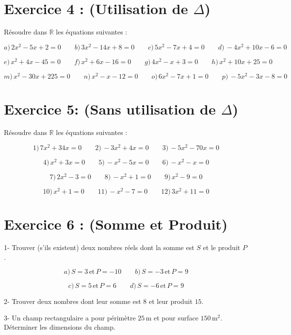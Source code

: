 \documentclass[12pt]{article}
\begin{document}
\section*{Exercice 4 : (Utilisation de \(\Delta\))}

Résoudre dans \(\mathbb{R}\) les équations suivantes :

\[
a) \, 2x^2 - 5x + 2 = 0 \quad\quad b) \, 3x^2 - 14x + 8 = 0 \quad\quad c) \, 5x^2 - 7x + 4 = 0 \quad\quad d) \, -4x^2 + 10x - 6 = 0
\]

\[
e) \, x^2 + 4x - 45 = 0 \quad\quad f) \, x^2 + 6x - 16 = 0 \quad\quad g) \, 4x^2 - x + 3 = 0 \quad\quad h) \, x^2 + 10x + 25 = 0
\]

\[
m) \, x^2 - 30x + 225 = 0 \quad\quad n) \, x^2 - x - 12 = 0 \quad\quad o) \, 6x^2 - 7x + 1 = 0 \quad\quad p) \, -5x^2 - 3x - 8 = 0
\]

\section*{Exercice 5: (Sans utilisation de \(\Delta\))}

Résoudre dans \(\mathbb{R}\) les équations suivantes :

\[
1) \, 7x^2 + 34x = 0 \quad\quad 2) \, -3x^2 + 4x = 0 \quad\quad 3) \, -5x^2 - 70x = 0
\]

\[
4) \, x^2 + 3x = 0 \quad\quad 5) \, -x^2 - 5x = 0 \quad\quad 6) \, -x^2 - x = 0
\]

\[
7) \, 2x^2 - 3 = 0 \quad\quad 8) \, -x^2 + 1 = 0 \quad\quad 9) \, x^2 - 9 = 0
\]

\[
10) \, x^2 + 1 = 0 \quad\quad 11) \, -x^2 - 7 = 0 \quad\quad 12) \, 3x^2 + 11 = 0
\]

\section*{Exercice 6 : (Somme et Produit)}

1- Trouver (s’ils existent) deux nombres réels dont la somme est \( S \) et le produit \( P \).

\[
a) \, S = 3 \, \text{et} \, P = -10 \quad\quad b) \, S = -3 \, \text{et} \, P = 9
\]

\[
c) \, S = 5 \, \text{et} \, P = 6 \quad\quad d) \, S = -6 \, \text{et} \, P = 9
\]

2- Trouver deux nombres dont leur somme est \( 8 \) et leur produit \( 15 \).

3- Un champ rectangulaire a pour périmètre \( 25 \, \text{m} \) et pour surface \( 150 \, \text{m}^2 \). Déterminer les dimensions du champ.
\end{document}
